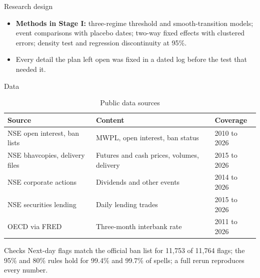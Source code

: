 \documentclass[11pt]{beamer}
\begin{document}
\begin{frame}{Research design}
  \centering
  \vspace{8pt}
  \begin{itemize}
    \small
    \item \textbf{Methods in Stage I:} three-regime threshold and smooth-transition models; event comparisons with
    placebo dates; two-way fixed effects with clustered errors; density test and regression discontinuity at 95\%.
    \item Every detail the plan left open was fixed in a dated log before the test that needed it.
  \end{itemize}
\end{frame}

\begin{frame}{Data}
  \begin{table}
    \scriptsize
    \caption{Public data sources}
    \begin{tabular}{@{}p{3.6cm}p{4.6cm}p{2.0cm}@{}}
      \toprule
      Source & Content & Coverage \\
      \midrule
      NSE open interest, ban lists & MWPL, open interest, ban status & 2010 to 2026 \\
      NSE bhavcopies, delivery files & Futures and cash prices, volumes, delivery & 2015 to 2026 \\
      NSE corporate actions & Dividends and other events & 2014 to 2026 \\
      NSE securities lending & Daily lending trades & 2015 to 2026 \\
      OECD via FRED & Three-month interbank rate & 2011 to 2026 \\
      \bottomrule
    \end{tabular}
  \end{table}
  \begin{exampleblock}{Checks}
    \small Next-day flags match the official ban list for 11,753 of 11,764 flags; the 95\% and 80\% rules hold for 99.4\%
    and 99.7\% of spells; a full rerun reproduces every number.
  \end{exampleblock}
\end{frame}
\end{document}

